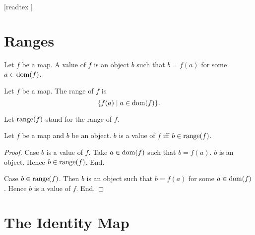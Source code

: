 \documentclass[10pt]{article}
\begin{document}
  \begin{imports}
    \begin{forthel}

      [readtex ]

    \end{forthel}
  \end{imports}


  \section{Ranges}

  \begin{forthel}
    \begin{definition}
      Let $f$ be a map.
      A value of $f$ is an object $b$ such that $b = f(a)$ for some
      $a \in \operatorname{dom}(f)$.
    \end{definition}
  \end{forthel}

  \begin{forthel}
    \begin{definition}
      Let $f$ be a map.
      The range of $f$ is
      \[ \{ f(a) \mid a \in \operatorname{dom}(f) \}. \]
    \end{definition}

    Let $\textrm{range}(f)$ stand for the range of $f$.
  \end{forthel}

  \begin{forthel}
    \begin{proposition}
      Let $f$ be a map and $b$ be an object.
      $b$ is a value of $f$ iff $b \in \textrm{range}(f)$.
    \end{proposition}
    \begin{proof}
      Case $b$ is a value of $f$.
        Take $a \in \operatorname{dom}(f)$ such that $b = f(a)$.
        $b$ is an object.
        Hence $b \in \textrm{range}(f)$.
      End.

      Case $b \in \textrm{range}(f)$.
        Then $b$ is an object such that $b = f(a)$ for some $a \in \operatorname{dom}(f)$.
        Hence $b$ is a value of $f$.
      End.
    \end{proof}
  \end{forthel}


  \section{The Identity Map}
\end{document}
